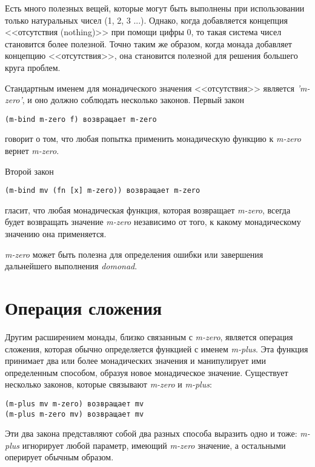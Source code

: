 \documentclass[a4paper,12pt]{article}
\newcommand{\cl}[1] {{\it #1}}
\begin{document}
Есть много полезных вещей, которые могут быть выполнены при использовании только натуральных чисел
(1, 2, 3 ...). Однако, когда добавляется концепция <<отсутствия (nothing)>> при помощи цифры 0, то такая система
чисел становится более полезной. Точно таким же образом, когда монада добавляет концепцию <<отсутствия>>, она
становится полезной для решения большего круга проблем.

Стандартным именем для монадического значения <<отсутствия>> является \cl{'m-zero'}, и оно должно соблюдать
несколько законов. Первый закон

\begin{verbatim}
(m-bind m-zero f) возвращает m-zero
\end{verbatim}
говорит о том, что любая попытка применить монадическую функцию к \cl{m-zero} вернет \cl{m-zero}. 

Второй закон

\begin{verbatim}
(m-bind mv (fn [x] m-zero)) возвращает m-zero
\end{verbatim}
гласит, что любая монадическая функция, которая возвращает \cl{m-zero}, всегда будет возвращать
значение \cl{m-zero} независимо от того, к какому монадическому значению она применяется.

\cl{m-zero} может быть полезна для определения ошибки или завершения дальнейшего выполнения \cl{domonad}. 



\section{Операция сложения}\label{plus}
Другим расширением монады, близко связанным с \cl{m-zero}, является операция сложения, которая обычно
определяется функцией с именем \cl{m-plus}.
Эта функция принимает два или более монадических значения 
и манипулирует ими определенным способом, образуя новое монадическое значение. Существует 
несколько законов, которые связывают \cl{m-zero} и \cl{m-plus}:

\begin{verbatim}
(m-plus mv m-zero) возвращает mv
(m-plus m-zero mv) возвращает mv
\end{verbatim}

Эти два закона представляют собой два разных способа выразить одно и тоже: \cl{m-plus} игнорирует
любой параметр, имеющий \cl{m-zero} значение, а остальными оперирует обычным образом. 
\end{document}
